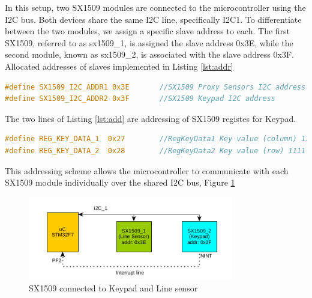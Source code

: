 \documentclass[english]{article}
\begin{document}
In this setup, two SX1509 modules are connected to the microcontroller using the I2C bus. 
Both devices share the same I2C line, specifically I2C1. To differentiate between the two modules,
we assign a specific slave address to each. 
The first SX1509, referred to as sx1509\_1, is assigned
  the slave address 0x3E, while the second module, known as sx1509\_2, is associated with the slave address 0x3F.
\\Allocated addresses of slaves implemented in Listing \ref{lst:addr}
\begin{lstlisting}[language=C, caption={I2C Addresses}, label={lst:addr} ]
#define SX1509_I2C_ADDR1 0x3E       //SX1509 Proxy Sensors I2C address
#define SX1509_I2C_ADDR2 0x3F       //SX1509 Keypad I2C address
\end{lstlisting}
The two lines of Listing \ref{lst:add} are addressing of SX1509 registes for Keypad.
\begin{lstlisting}[language=C, caption={Keypad Data registers}, label={lst:add} ]
#define REG_KEY_DATA_1  0x27        //RegKeyData1 Key value (column) 1111 1111
#define REG_KEY_DATA_2  0x28	    //RegKeyData2 Key value (row) 1111 1111
\end{lstlisting}
This addressing scheme allows the microcontroller to communicate with each SX1509 module individually over the shared I2C bus,
Figure \ref{fig:SX1509}
\begin{figure}[!h]
	\centering
	\includegraphics[width=0.80\textwidth,]{figures/SX.png}
	\caption{SX1509 connected to Keypad and Line sensor}
	\label{fig:SX1509}
\end{figure}
\end{document}
